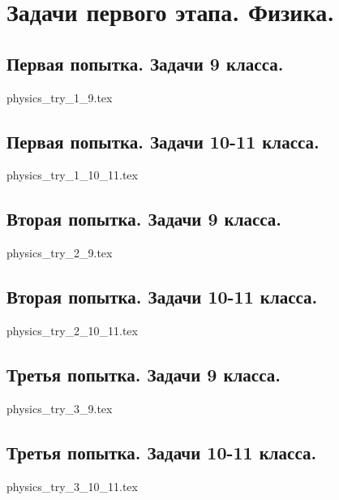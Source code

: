 \chapter{Задачи первого этапа. Физика.}

\section{Первая попытка. Задачи 9 класса.}

{physics_try_1_9.tex}

\section{Первая попытка. Задачи 10-11 класса.}

{physics_try_1_10_11.tex}

\section{Вторая попытка. Задачи 9 класса.}

{physics_try_2_9.tex}

\section{Вторая попытка. Задачи 10-11 класса.}

{physics_try_2_10_11.tex}

\section{Третья попытка. Задачи 9 класса.}

{physics_try_3_9.tex}

\section{Третья попытка. Задачи 10-11 класса.}

{physics_try_3_10_11.tex}
